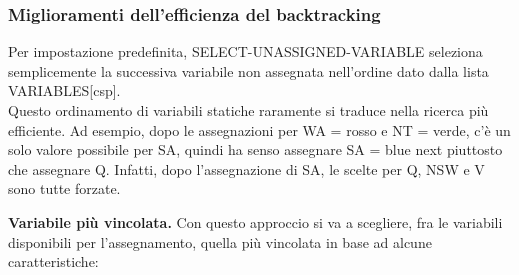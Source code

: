 \subsubsection{Miglioramenti dell’efficienza del backtracking}
Per impostazione predefinita, SELECT-UNASSIGNED-VARIABLE seleziona semplicemente la successiva variabile non assegnata nell’ordine dato dalla lista VARIABLES[csp]. 
\\Questo ordinamento di variabili statiche raramente si traduce nella ricerca più efficiente. Ad esempio, dopo le assegnazioni per WA = rosso e NT = verde, c’è un solo valore possibile per SA, quindi ha senso assegnare SA = blue next piuttosto che assegnare Q. Infatti, dopo l’assegnazione di SA, le scelte per Q, NSW e V sono tutte forzate.

\textbf{Variabile più vincolata.} Con questo approccio si va a scegliere, fra le variabili disponibili per l’assegnamento, quella più vincolata in base ad alcune caratteristiche:
